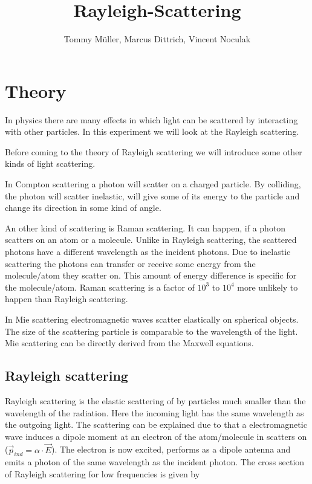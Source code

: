 \documentclass[10pt,a4paper]{article}
\author{Tommy Müller, Marcus Dittrich, Vincent Noculak}
\title{Rayleigh-Scattering}
\begin{document}
\maketitle
\newpage
\newpage

\section{Theory}

In physics there are many effects in which light can be scattered by interacting with other particles. In this experiment we will look at the Rayleigh scattering.

Before coming to the theory of Rayleigh scattering we will introduce some other kinds of light scattering.

In Compton scattering a photon will scatter on a charged particle. By colliding, the photon will scatter inelastic, will give some of its energy to the particle and change its direction in some kind of angle.

An other kind of scattering is Raman scattering. It can happen, if a photon scatters on an atom or a molecule. Unlike in Rayleigh scattering, the scattered photons have a different wavelength as the incident photons. Due to inelastic scattering the photons can transfer or receive some energy from the molecule/atom they scatter on. This amount of energy difference is specific for the molecule/atom. Raman scattering is a factor of $10^3$ to $10^4$ more unlikely to happen than Rayleigh scattering.

In Mie scattering electromagnetic waves scatter elastically on spherical objects. The size of the scattering particle is comparable to the wavelength of the light. Mie scattering can be directly derived from the Maxwell equations.

\subsection{Rayleigh scattering}

Rayleigh scattering is the elastic scattering of by particles much smaller than the wavelength of the radiation. Here the incoming light has the same wavelength as the outgoing light.
The scattering can be explained due to that a electromagnetic wave induces a dipole moment at an electron of the atom/molecule in scatters on ($\vec{p}_{ind} = \alpha \cdot \vec{E}$). The electron is now excited, performs as a dipole antenna and emits a photon of the same wavelength as the incident photon.
The cross section of Rayleigh scattering for low frequencies is given by
\end{document}
